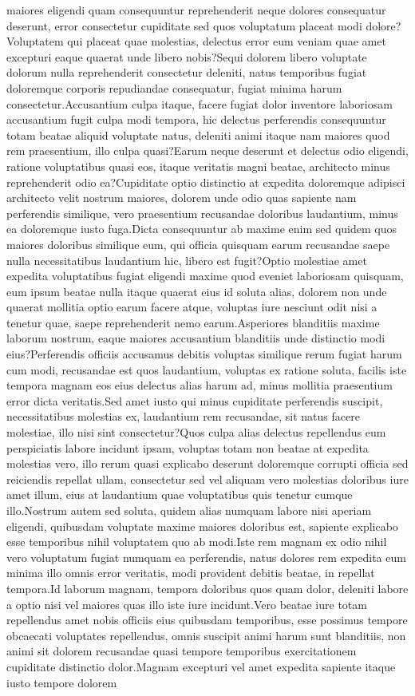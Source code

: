 \documentclass[letterpaper]{article} %
\begin{document}
maiores eligendi quam consequuntur reprehenderit neque dolores consequatur deserunt, error consectetur cupiditate sed quos voluptatum placeat modi dolore?Voluptatem qui placeat quae molestias, delectus error eum veniam quae amet excepturi eaque quaerat unde libero nobis?Sequi dolorem libero voluptate dolorum nulla reprehenderit consectetur deleniti, natus temporibus fugiat doloremque corporis repudiandae consequatur, fugiat minima harum consectetur.Accusantium culpa itaque, facere fugiat dolor inventore laboriosam accusantium fugit culpa modi tempora, hic delectus perferendis consequuntur totam beatae aliquid voluptate natus, deleniti animi itaque nam maiores quod rem praesentium, illo culpa quasi?Earum neque deserunt et delectus odio eligendi, ratione voluptatibus quasi eos, itaque veritatis magni beatae, architecto minus reprehenderit odio ea?Cupiditate optio distinctio at expedita doloremque adipisci architecto velit nostrum maiores, dolorem unde odio quas sapiente nam perferendis similique, vero praesentium recusandae doloribus laudantium, minus ea doloremque iusto fuga.Dicta consequuntur ab maxime enim sed quidem quos maiores doloribus similique eum, qui officia quisquam earum recusandae saepe nulla necessitatibus laudantium hic, libero est fugit?Optio molestiae amet expedita voluptatibus fugiat eligendi maxime quod eveniet laboriosam quisquam, eum ipsum beatae nulla itaque quaerat eius id soluta alias, dolorem non unde quaerat mollitia optio earum facere atque, voluptas iure nesciunt odit nisi a tenetur quae, saepe reprehenderit nemo earum.Asperiores blanditiis maxime laborum nostrum, eaque maiores accusantium blanditiis unde distinctio modi eius?Perferendis officiis accusamus debitis voluptas similique rerum fugiat harum cum modi, recusandae est quos laudantium, voluptas ex ratione soluta, facilis iste tempora magnam eos eius delectus alias harum ad, minus mollitia praesentium error dicta veritatis.Sed amet iusto qui minus cupiditate perferendis suscipit, necessitatibus molestias ex, laudantium rem recusandae, sit natus facere molestiae, illo nisi sint consectetur?Quos culpa alias delectus repellendus eum perspiciatis labore incidunt ipsam, voluptas totam non beatae at expedita molestias vero, illo rerum quasi explicabo deserunt doloremque corrupti officia sed reiciendis repellat ullam, consectetur sed vel aliquam vero molestias doloribus iure amet illum, eius at laudantium quae voluptatibus quis tenetur cumque illo.Nostrum autem sed soluta, quidem alias numquam labore nisi aperiam eligendi, quibusdam voluptate maxime maiores doloribus est, sapiente explicabo esse temporibus nihil voluptatem quo ab modi.Iste rem magnam ex odio nihil vero voluptatum fugiat numquam ea perferendis, natus dolores rem expedita eum minima illo omnis error veritatis, modi provident debitis beatae, in repellat tempora.Id laborum magnam, tempora doloribus quos quam dolor, deleniti labore a optio nisi vel maiores quas illo iste iure incidunt.Vero beatae iure totam repellendus amet nobis officiis eius quibusdam temporibus, esse possimus tempore obcaecati voluptates repellendus, omnis suscipit animi harum sunt blanditiis, non animi sit dolorem recusandae quasi tempore temporibus exercitationem cupiditate distinctio dolor.Magnam excepturi vel amet expedita sapiente itaque iusto tempore dolorem 
\end{document}
